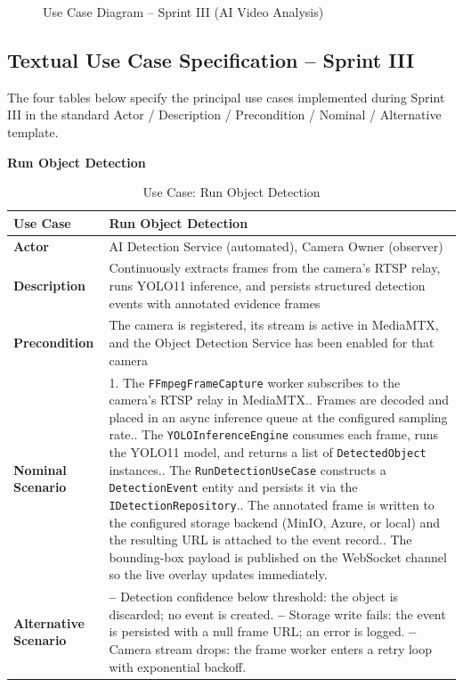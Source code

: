 \begin{figure}[H]
\centering
{}
\caption{Use Case Diagram -- Sprint III (AI Video Analysis)}
\label{fig:sprint3_use_case}
\end{figure}

\subsection{Textual Use Case Specification -- Sprint III}
\label{subsec:s3_uc_spec}

\hspace{0.8cm}The four tables below specify the principal use cases implemented during Sprint III in the standard Actor / Description / Precondition / Nominal / Alternative template.

\textbf{Run Object Detection}
\begin{table}[H]
\centering\small
\begin{tabular}{|>{\bfseries}p{3cm}|p{10cm}|}
\hline
Use Case    & Run Object Detection \\ \hline
Actor       & AI Detection Service (automated), Camera Owner (observer) \\ \hline
Description & Continuously extracts frames from the camera's RTSP relay, runs YOLO11 inference, and persists structured detection events with annotated evidence frames \\ \hline
Precondition & The camera is registered, its stream is active in MediaMTX, and the Object Detection Service has been enabled for that camera \\ \hline
Nominal Scenario &
1. The \texttt{FFmpegFrameCapture} worker subscribes to the camera's RTSP relay in MediaMTX.\newline
2. Frames are decoded and placed in an async inference queue at the configured sampling rate.\newline
3. The \texttt{YOLOInferenceEngine} consumes each frame, runs the YOLO11 model, and returns a list of \texttt{DetectedObject} instances.\newline
4. The \texttt{RunDetectionUseCase} constructs a \texttt{DetectionEvent} entity and persists it via the \texttt{IDetectionRepository}.\newline
5. The annotated frame is written to the configured storage backend (MinIO, Azure, or local) and the resulting URL is attached to the event record.\newline
6. The bounding-box payload is published on the WebSocket channel so the live overlay updates immediately. \\ \hline
Alternative Scenario &
\textbf{--} Detection confidence below threshold: the object is discarded; no event is created.\newline
\textbf{--} Storage write fails: the event is persisted with a null frame URL; an error is logged.\newline
\textbf{--} Camera stream drops: the frame worker enters a retry loop with exponential backoff. \\ \hline
\end{tabular}
\caption{Use Case: Run Object Detection}
\label{tab:uc_object_detection}
\end{table}

